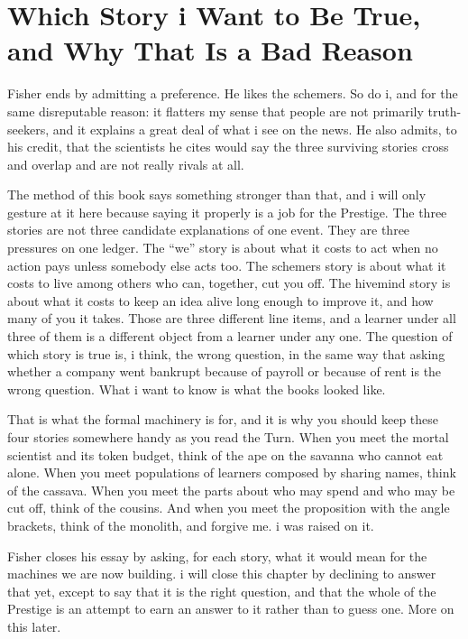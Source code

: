 \section{Which Story i Want to Be True, and Why That Is a Bad Reason}

Fisher ends by admitting a preference. He likes the schemers. So do i, and for the same disreputable reason: it flatters my sense that people are not primarily truth-seekers, and it explains a great deal of what i see on the news. He also admits, to his credit, that the scientists he cites would say the three surviving stories cross and overlap and are not really rivals at all.

The method of this book says something stronger than that, and i will only gesture at it here because saying it properly is a job for the Prestige. The three stories are not three candidate explanations of one event. They are three pressures on one ledger. The ``we'' story is about what it costs to act when no action pays unless somebody else acts too. The schemers story is about what it costs to live among others who can, together, cut you off. The hivemind story is about what it costs to keep an idea alive long enough to improve it, and how many of you it takes. Those are three different line items, and a learner under all three of them is a different object from a learner under any one. The question of which story is true is, i think, the wrong question, in the same way that asking whether a company went bankrupt because of payroll or because of rent is the wrong question. What i want to know is what the books looked like.

That is what the formal machinery is for, and it is why you should keep these four stories somewhere handy as you read the Turn. When you meet the mortal scientist and its token budget, think of the ape on the savanna who cannot eat alone. When you meet populations of learners composed by sharing names, think of the cassava. When you meet the parts about who may spend and who may be cut off, think of the cousins. And when you meet the proposition with the angle brackets, think of the monolith, and forgive me. i was raised on it.

Fisher closes his essay by asking, for each story, what it would mean for the machines we are now building. i will close this chapter by declining to answer that yet, except to say that it is the right question, and that the whole of the Prestige is an attempt to earn an answer to it rather than to guess one. More on this later.
